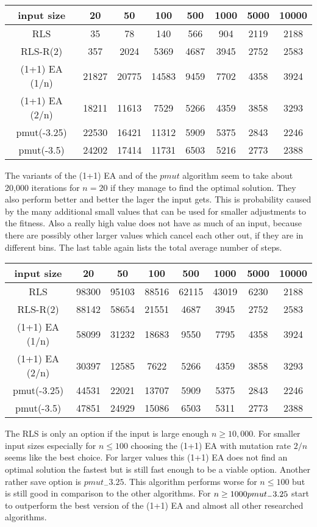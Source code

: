 \begin{tabular}{cccccccc}
      input size    & 20    & 50    & 100   & 500  & 1000 & 5000 & 10000 \\\hline
      RLS           & 35    & 78    & 140   & 566  & 904  & 2119 & 2188  \\
      RLS-R(2)      & 357   & 2024  & 5369  & 4687 & 3945 & 2752 & 2583  \\
      (1+1) EA (1/n) & 21827 & 20775 & 14583 & 9459 & 7702 & 4358 & 3924  \\
      (1+1) EA (2/n) & 18211 & 11613 & 7529  & 5266 & 4359 & 3858 & 3293  \\
      pmut(-3.25)   & 22530 & 16421 & 11312 & 5909 & 5375 & 2843 & 2246  \\
      pmut(-3.5)    & 24202 & 17414 & 11731 & 6503 & 5216 & 2773 & 2388  \\
\end{tabular}

The variants of the (1+1) EA and of the $pmut$ algorithm seem to take about 20,000 iterations for $n=20$ if they manage to find the optimal solution.
They also perform better and better the lager the input gets.
This is probability caused by the many additional small values that can be used for smaller adjustments to the fitness.
Also a really high value does not have as much of an input, because there are possibly other larger values which cancel each other out, if they are in different bins.
The last table again lists the total average number of steps.

\begin{tabular}{cccccccc}
      input size    & 20    & 50    & 100   & 500   & 1000  & 5000 & 10000 \\\hline
      RLS           & 98300 & 95103 & 88516 & 62115 & 43019 & 6230 & 2188  \\
      RLS-R(2)      & 88142 & 58654 & 21551 & 4687  & 3945  & 2752 & 2583  \\
      (1+1) EA (1/n) & 58099 & 31232 & 18683 & 9550  & 7795  & 4358 & 3924  \\
      (1+1) EA (2/n) & 30397 & 12585 & 7622  & 5266  & 4359  & 3858 & 3293  \\
      pmut(-3.25)   & 44531 & 22021 & 13707 & 5909  & 5375  & 2843 & 2246  \\
      pmut(-3.5)    & 47851 & 24929 & 15086 & 6503  & 5311  & 2773 & 2388  \\
\end{tabular}

The RLS is only an option if the input is large enough $n \ge 10,000$. For smaller input sizes especially for $n \le 100$ choosing the (1+1) EA with mutation rate $2/n$ seems like the best choice. For larger values this (1+1) EA does not find an optimal solution the fastest but is still fast enough to be a viable option. Another rather save option is $pmut_-3.25$. This algorithm performs worse for $n \le 100$ but is still good in comparison to the other algorithms. For $n \ge 1000 \space pmut_-3.25$ start to outperform the best version of the (1+1) EA and almost all other researched algorithms.